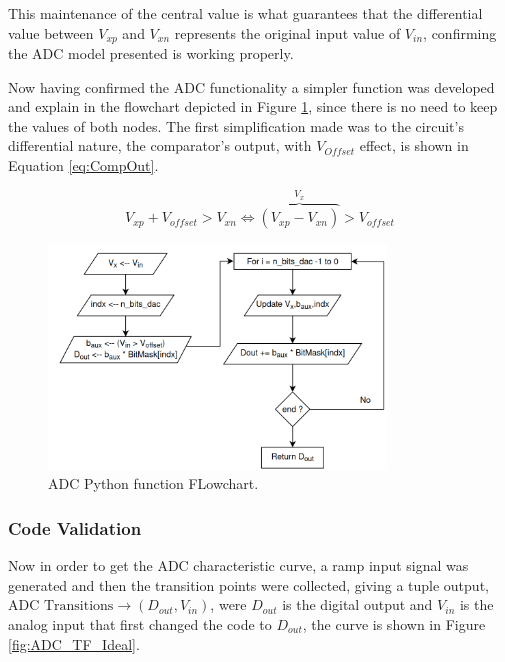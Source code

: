 This maintenance of the central value is what guarantees that the differential value between $V_{xp}$ and $V_{xn}$ represents the original input value of $V_{in}$, confirming the ADC model presented is working properly.

Now having confirmed the ADC functionality a simpler function was developed and explain in  the flowchart depicted in Figure \ref{fig:ADCFlowChart}, since there is no need to keep the values of both nodes.
The first simplification made was to the circuit's differential nature, the comparator's output, with $V_{Offset}$ effect, is shown in Equation \ref{eq:CompOut}.

\begin{equation}
    V_{xp} + V_{offset} > V_{xn} \Leftrightarrow \overbrace{( V_{xp} - V_{xn} )}^{V_x} > V_{offset} 
    \label{eq:CompOut}
\end{equation}

\begin{figure}[h]

    \centering
    \includegraphics*[width=0.8\textwidth]{Images/ADCPythonFlowChart.png}
    \caption{ADC Python function FLowchart.}

    \label{fig:ADCFlowChart}
\end{figure}

\subsubsection{Code Validation}

Now in order to get the ADC characteristic curve, a ramp input signal was generated and then the transition points were collected, giving a tuple output, $\text{ADC Transitions} \longrightarrow ( D_{out}, V_{in} ) $, were $D_{out}$ is the digital output and $V_{in}$ is the analog input that first changed the code to $D_{out}$, the curve is shown in Figure \ref{fig:ADC_TF_Ideal}.

